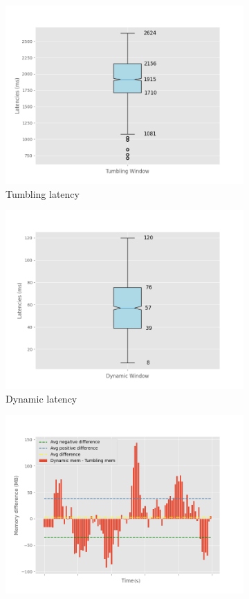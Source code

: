 \begin{figure}
\begin{subfigure}[b]{0.5\columnwidth}
        \includegraphics[width=\columnwidth]{fig/constant-rate/TumblingWindow_latency_boxplot.png}
        \caption{Tumbling latency}
        \label{fig:constant_tumb_boxplot}
    \end{subfigure}
    \hfill 
    \begin{subfigure}[b]{0.5\columnwidth}
        \includegraphics[width=\columnwidth]{fig/constant-rate/DynamicWindow_latency_boxplot.png}
        \caption{Dynamic latency}
        \label{fig:constant_dynamic_boxplot}
    \end{subfigure}
    \begin{subfigure}[b]{\columnwidth}
        \centering
        \includegraphics[width=0.7\columnwidth]{fig/constant-rate/mem_difference_bar.png}

\end{subfigure}
\end{figure}
